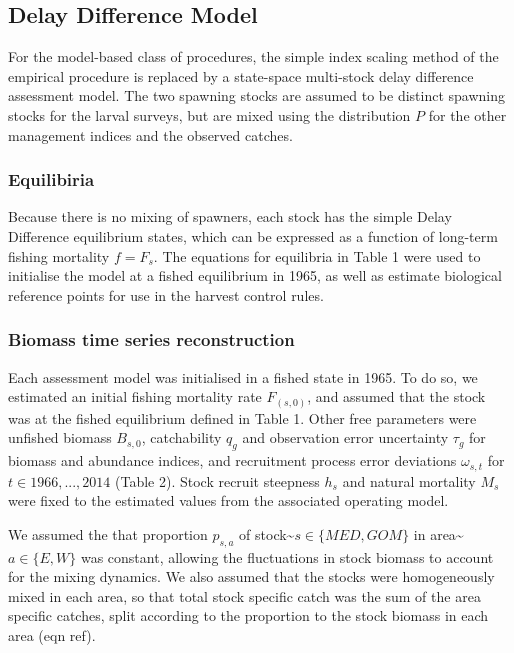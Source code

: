\documentclass[]{article}
\begin{document}
\hypertarget{delay-difference-model}{%
\subsection{Delay Difference Model}\label{delay-difference-model}}

For the model-based class of procedures, the simple index scaling
method of the empirical procedure is replaced by a state-space
multi-stock delay difference assessment model. The two spawning
stocks are assumed to be distinct spawning stocks for the larval
surveys, but are mixed using the distribution \(P\) for
the other management indices and the observed catches.

\hypertarget{equilibiria}{%
\subsubsection{Equilibiria}\label{equilibiria}}

Because there is no mixing of spawners, each stock has the simple Delay
Difference equilibrium states, which can be expressed as a function
of long-term fishing mortality \(f = F_s\). The equations for equilibria
in Table 1 were used to initialise the model at a fished equilibrium
in 1965, as well as estimate biological reference points for use in
the harvest control rules.

\hypertarget{biomass-time-series-reconstruction}{%
\subsubsection{Biomass time series reconstruction}\label{biomass-time-series-reconstruction}}

Each assessment model was initialised in a fished state in 1965. To do so,
we estimated an initial fishing mortality rate \(F_(s,0)\), and assumed
that the stock was at the fished equilibrium defined in Table 1. Other free
parameters were unfished biomass \(B_{s,0}\), catchability \(q_g\) and
observation error uncertainty \(\tau_g\) for biomass and abundance indices,
and recruitment process error deviations \(\omega_{s,t}\) for
\(t \in 1966,..., 2014\) (Table 2). Stock recruit steepness \(h_s\)
and natural mortality \(M_s\) were fixed to the estimated values from
the associated operating model.

We assumed the that proportion \(p_{s,a}\) of
stock\textasciitilde{}\(s \in \{MED,GOM\}\) in area\textasciitilde{}\(a \in \{E,W\}\) was
constant, allowing the fluctuations in stock biomass to
account for the mixing dynamics. We also assumed that the stocks
were homogeneously mixed in each area, so that total stock specific
catch was the sum of the area specific catches, split according
to the proportion to the stock biomass in each area (eqn ref).
\end{document}
